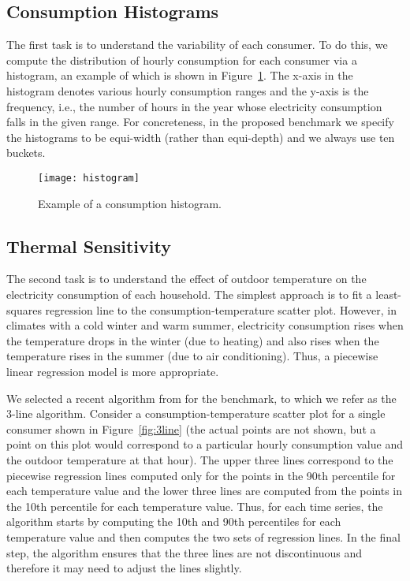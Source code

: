 \documentclass[prodmode,acmtods]{acmsmall}
\begin{document}
\subsection{Consumption Histograms}

The first task is to understand the variability of each consumer.  To do this, we compute the distribution of hourly consumption for each consumer via a histogram, an example of which is shown in Figure~\ref{fig:histogram}.  The x-axis in the histogram denotes various hourly consumption ranges and the y-axis is the frequency, i.e., the number of hours in the year whose electricity consumption falls in the given range.  For concreteness, in the proposed benchmark we specify the histograms to be equi-width (rather than equi-depth) and we always use ten buckets.

\begin{figure}[t]
  \centering
  \texttt{[image: histogram]}
 \vspace{-120pt}
  \caption{Example of a consumption histogram.}
  \label{fig:histogram}
\end{figure}

\subsection{Thermal Sensitivity} \label{sec:3line}

The second task is to understand the effect of outdoor temperature on the electricity consumption of each household.  The simplest approach is to fit a least-squares regression line to the consumption-temperature scatter plot.  However, in climates with a cold winter and warm summer, electricity consumption rises when the temperature drops in the winter (due to heating) and also rises when the temperature rises in the summer (due to air conditioning).  Thus, a piecewise linear regression model is more appropriate.

We selected a recent algorithm from \cite{birt} for the benchmark, to which we refer as the 3-line algorithm.  Consider a consumption-temperature scatter plot for a single consumer shown in Figure~\ref{fig:3line} (the actual points are not shown, but a point on this plot would correspond to a particular hourly consumption value and the outdoor temperature at that hour).  The upper three lines correspond to the piecewise regression lines computed only for the points in the 90th percentile for each temperature value and the lower three lines are computed from the points in the 10th percentile for each temperature value.  Thus, for each time series, the algorithm starts by computing the 10th and 90th percentiles for each temperature value and then computes the two sets of regression lines.  In the final step, the algorithm ensures that the three lines are not discontinuous and therefore it may need to adjust the lines slightly. 
\end{document}
